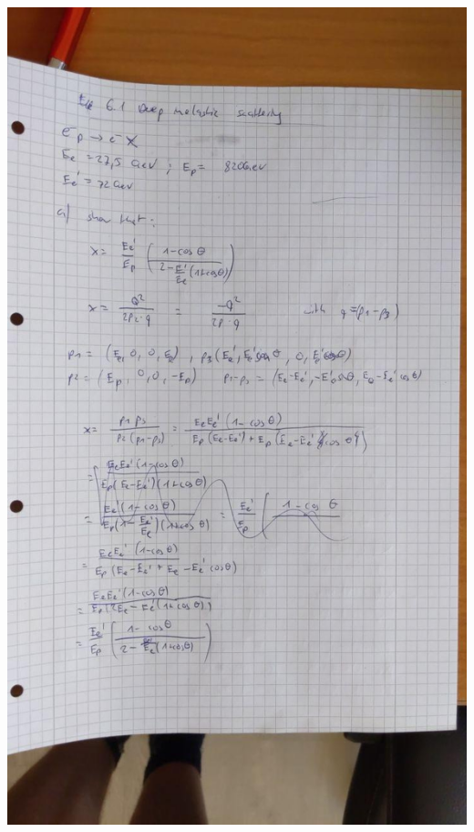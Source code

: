 \documentclass{article}
\begin{document}
    \includegraphics[width=.9\textwidth,trim=0 140 0 80,clip]{6-1.jpg}\\
\end{document}

